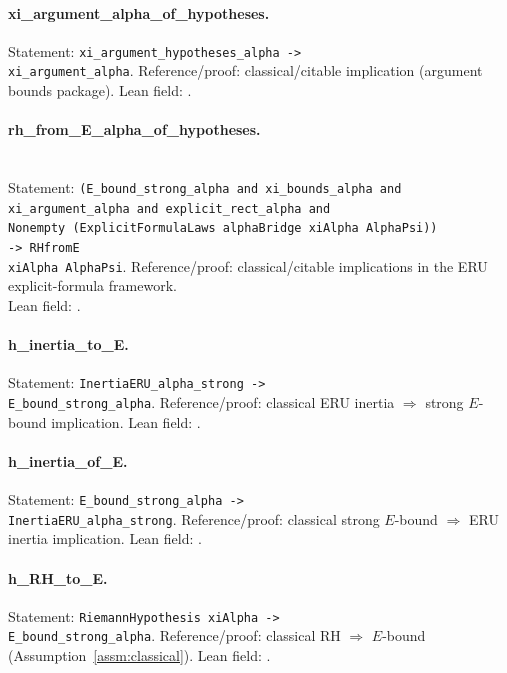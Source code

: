 \paragraph{xi\_argument\_alpha\_of\_hypotheses.}
Statement: \texttt{xi\_argument\_hypotheses\_alpha ->}\\
\texttt{xi\_argument\_alpha}.
Reference/proof: classical/citable implication (argument bounds package).
Lean field: \allowbreak{}.

\paragraph{rh\_from\_E\_alpha\_of\_hypotheses.}\leavevmode\\
Statement: \texttt{(E\_bound\_strong\_alpha and xi\_bounds\_alpha and}\\
\texttt{xi\_argument\_alpha and explicit\_rect\_alpha and}\\
\texttt{Nonempty (ExplicitFormulaLaws alphaBridge xiAlpha AlphaPsi))}\\
\texttt{-> RHfromE}\\
\texttt{xiAlpha AlphaPsi}.
Reference/proof: classical/citable implications in the ERU explicit-formula framework.\\
Lean field: \allowbreak{}.

\paragraph{h\_inertia\_to\_E.}
Statement: \texttt{InertiaERU\_alpha\_strong ->}\\
\texttt{E\_bound\_strong\_alpha}.
Reference/proof: classical ERU inertia $\Rightarrow$ strong $E$-bound implication.
Lean field: \allowbreak{}.

\paragraph{h\_inertia\_of\_E.}
Statement: \texttt{E\_bound\_strong\_alpha ->}\\
\texttt{InertiaERU\_alpha\_strong}.
Reference/proof: classical strong $E$-bound $\Rightarrow$ ERU inertia implication.
Lean field: \allowbreak{}.

\paragraph{h\_RH\_to\_E.}
Statement: \texttt{RiemannHypothesis xiAlpha ->}\\
\texttt{E\_bound\_strong\_alpha}.
Reference/proof: classical RH $\Rightarrow$ $E$-bound (Assumption~\ref{assm:classical}).
Lean field: \allowbreak{}.
